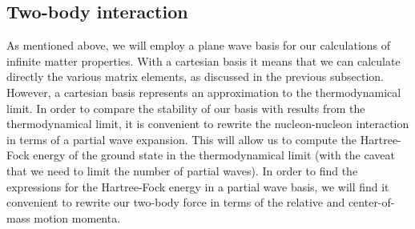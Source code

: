 \subsection{Two-body interaction}

As mentioned above, we will employ a plane wave basis
for our calculations of infinite matter properties. With a cartesian
basis it means that we can calculate directly the various matrix
elements, as discussed in the previous subsection. However, a
cartesian basis represents an approximation to the thermodynamical limit. In
order to compare the stability of our basis with results from the
thermodynamical limit, it is convenient to rewrite the nucleon-nucleon
interaction in terms of a partial wave expansion. This will allow us
to compute the Hartree-Fock energy of the ground state in the
thermodynamical limit (with the caveat that we need to limit the
number of partial waves). In order to find the expressions for the
Hartree-Fock energy in a partial wave basis, we will find it
convenient to rewrite our two-body force in terms of the relative and
center-of-mass motion momenta.

